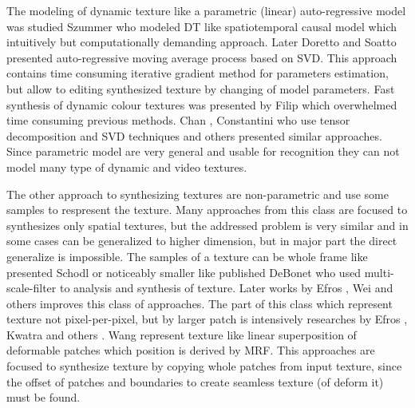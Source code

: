 

		The modeling of dynamic texture like a parametric (linear) auto-regressive model was studied Szummer \cite {Szummer:1995,Szummer95,Szummer96a}  who modeled DT like spatiotemporal causal model which intuitively but computationally demanding approach. Later Doretto \cite{doretto02thesis,doretto05dissertation,Dyn_tex_jourmal_dorettoCWS03ijcv} and Soatto \cite{Dyn_tex_soatto01} presented auto-regressive moving average process based on SVD. This approach contains time consuming iterative gradient method for parameters estimation, but allow to editing synthesized texture by changing of model parameters. Fast synthesis of dynamic colour textures was presented by Filip \cite{Filip06FastSynthesis} which overwhelmed time consuming previous methods. Chan \cite{ChanV05:0}, Constantini \cite{Costantini_dynamictexture}  \cite{Costantini08higherorder} who use tensor decomposition and SVD techniques and others \cite{Vidal05opticalflow}\cite{LiuLA05} presented similar approaches. Since parametric model are very general and usable for recognition \cite{dyn_tex_rec_saisanDWS01cvpr} they can not model many type of dynamic and video textures.


		
	The other approach to synthesizing textures are non-parametric and use some samples to respresent the texture. Many approaches from this class are focused to synthesizes only spatial textures, but the addressed problem is very similar and in some cases can be generalized to higher dimension, but in major part the direct generalize is impossible. The samples of a texture can be whole frame like presented Schodl \cite{Schodl00videotextures} or noticeably smaller like published DeBonet\cite{Bonet98multiresolutionsampling} who used multi-scale-filter to analysis and synthesis of texture. Later works by Efros \cite{Efros99texturesynthesis}, Wei \cite{Wei00fasttexture} and others improves this class of approaches. The part of this class which represent texture not pixel-per-pixel, but by larger patch is intensively researches by Efros \cite{Efros01imagequilting}, Kwatra \cite{Kwatra03graphcuttextures} \cite{Kwatra05textureoptimization} and others 
	\cite{Dong09robusttile-based}\cite{WangZ02:6}. Wang \cite{Wang04analysisand} represent texture like linear superposition of deformable patches which position is derived by MRF. This approaches are focused to synthesize texture by copying whole patches from input texture, since the offset of patches and boundaries to create seamless texture (of deform it) must be found.

